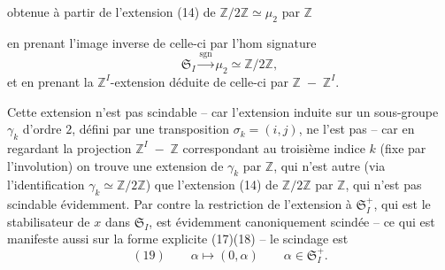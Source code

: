 obtenue à partir de l'extension (14) de $\mathbb Z/2\mathbb Z\simeq\mu_2$ par $\mathbb Z$


en prenant l'image inverse de celle-ci par l'hom signature
\[
\mathfrak S_I\xrightarrow{\operatorname{sgn}}\mu_2\simeq\mathbb Z/2\mathbb Z,
\]
et en prenant la $\mathbb Z^I$-extension déduite de celle-ci par   $\mathbb Z\;-\;\mathbb Z^I$.

Cette extension n'est pas scindable -- car l'extension induite sur un sous-groupe $\gamma_k$ d'ordre $2$, défini par une transposition $\sigma_k=(i,j)$, ne l'est pas -- car en regardant la projection $\mathbb Z^I\;-\;\mathbb Z$ correspondant au troisième indice $k$ (fixe par l'involution) on trouve une extension de $\gamma_k$ par $\mathbb Z$, qui n'est autre (via l'identification $\gamma_k\simeq\mathbb Z/2\mathbb Z$) que l'extension (14) de $\mathbb Z/2\mathbb Z$ par $\mathbb Z$, qui n'est pas scindable évidemment. Par contre la restriction de l'extension à $\mathfrak S_I^+$, qui est le stabilisateur de $x$ dans $\mathfrak S_I$, est évidemment canoniquement scindée -- ce qui est manifeste aussi sur la forme explicite (17)(18) -- le scindage est
\[
(19)\qquad\alpha\longmapsto(0,\alpha)\qquad\alpha\in\mathfrak S_I^+.
\]
